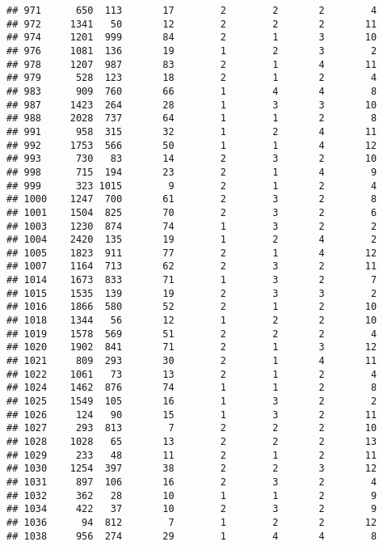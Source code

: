 \documentclass[]{article}
\begin{document}
\begin{verbatim}
## 971      650  113       17        2        2       2        4
## 972     1341   50       12        2        2       2       11
## 974     1201  999       84        2        1       3       10
## 976     1081  136       19        1        2       3        2
## 978     1207  987       83        2        1       4       11
## 979      528  123       18        2        1       2        4
## 983      909  760       66        1        4       4        8
## 987     1423  264       28        1        3       3       10
## 988     2028  737       64        1        1       2        8
## 991      958  315       32        1        2       4       11
## 992     1753  566       50        1        1       4       12
## 993      730   83       14        2        3       2       10
## 998      715  194       23        2        1       4        9
## 999      323 1015        9        2        1       2        4
## 1000    1247  700       61        2        3       2        8
## 1001    1504  825       70        2        3       2        6
## 1003    1230  874       74        1        3       2        2
## 1004    2420  135       19        1        2       4        2
## 1005    1823  911       77        2        1       4       12
## 1007    1164  713       62        2        3       2       11
## 1014    1673  833       71        1        3       2        7
## 1015    1535  139       19        2        3       3        2
## 1016    1866  580       52        2        1       2       10
## 1018    1344   56       12        1        2       2       10
## 1019    1578  569       51        2        2       2        4
## 1020    1902  841       71        2        1       3       12
## 1021     809  293       30        2        1       4       11
## 1022    1061   73       13        2        1       2        4
## 1024    1462  876       74        1        1       2        8
## 1025    1549  105       16        1        3       2        2
## 1026     124   90       15        1        3       2       11
## 1027     293  813        7        2        2       2       10
## 1028    1028   65       13        2        2       2       13
## 1029     233   48       11        2        1       2       11
## 1030    1254  397       38        2        2       3       12
## 1031     897  106       16        2        3       2        4
## 1032     362   28       10        1        1       2        9
## 1034     422   37       10        2        3       2        9
## 1036      94  812        7        1        2       2       12
## 1038     956  274       29        1        4       4        8

\end{verbatim}
\end{document}
